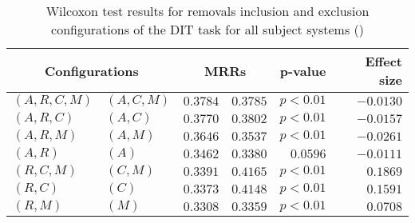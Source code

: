 
\begin{table}
\begin{spacing}{1.2}
\centering
\caption{Wilcoxon test results for removals inclusion and exclusion configurations of the DIT task for all subject systems (\ctwo)}
\label{table:versus-wilcox-all-dit-removals}
\begin{tabular}{ll|rr|rr}
\toprule
      \multicolumn{2}{c|}{Configurations} &                \multicolumn{2}{c|}{MRRs} &             p-value & Effect size \\
\midrule
 $(A,R,C,M)$ &  $(A,C,M)$ &       $0.3784$ &  $\bm{0.3785}$ & $p<0.01$ &   $-0.0130$ \\
   $(A,R,C)$ &    $(A,C)$ &       $0.3770$ &  $\bm{0.3802}$ & $p<0.01$ &   $-0.0157$ \\
   $(A,R,M)$ &    $(A,M)$ &  $\bm{0.3646}$ &       $0.3537$ & $p<0.01$ &   $-0.0261$ \\
     $(A,R)$ &      $(A)$ &  $\bm{0.3462}$ &       $0.3380$ & $0.0596$ &   $-0.0111$ \\
   $(R,C,M)$ &    $(C,M)$ &       $0.3391$ &  $\bm{0.4165}$ & $p<0.01$ &    $0.1869$ \\
     $(R,C)$ &      $(C)$ &       $0.3373$ &  $\bm{0.4148}$ & $p<0.01$ &    $0.1591$ \\
     $(R,M)$ &      $(M)$ &       $0.3308$ &  $\bm{0.3359}$ & $p<0.01$ &    $0.0708$ \\
\bottomrule
\end{tabular}

\end{spacing}
\end{table}

